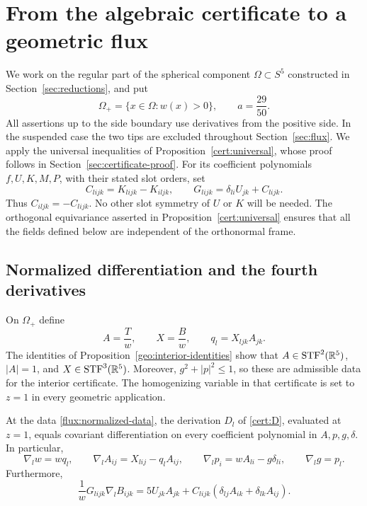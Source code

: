\section{From the algebraic certificate to a geometric flux}
\label{flux:section}
\label{sec:flux}

We work on the regular part of the spherical component $\Omega\subset S^5$
constructed in Section~\ref{sec:reductions}, and put
\[
  \Omega_+=\{x\in\Omega:w(x)>0\},\qquad a=\frac{29}{50}.
\]
All assertions up to the side boundary use derivatives from the positive
side.  In the suspended case the two tips are excluded throughout
Section~\ref{sec:flux}.  We apply the universal inequalities of
Proposition~\ref{cert:universal}, whose proof follows in
Section~\ref{sec:certificate-proof}.  For its coefficient polynomials
$f,U,K,M,P$, with their stated slot orders, set
\begin{equation}\label{flux:CG}
 C_{lijk}=K_{lijk}-K_{iljk},\qquad
 G_{lijk}=\delta_{li}U_{jk}+C_{lijk}.
\end{equation}
Thus $C_{iljk}=-C_{lijk}$.  No other slot symmetry of $U$ or $K$ will be
needed.  The orthogonal equivariance asserted in
Proposition~\ref{cert:universal} ensures that all the fields defined below
are independent of the orthonormal frame.

\subsection{Normalized differentiation and the fourth derivatives}

On $\Omega_+$ define
\begin{equation}\label{flux:normalized-data}
 A=\frac{T}{w},\qquad X=\frac{B}{w},\qquad
 q_l=X_{ljk}A_{jk}.
\end{equation}
The identities of Proposition~\ref{geo:interior-identities} show that
$A\in\operatorname{STF}^2(\mathbb R^5)$, $|A|=1$, and $X\in\operatorname{STF}^3(\mathbb R^5)$.
Moreover, $g^2+|p|^2\leq1$, so these are admissible data for the
interior certificate.  The homogenizing variable in that certificate is
set to $z=1$ in every geometric application.

\begin{lemma}\label{flux:normalized-differentiation}
At the data \eqref{flux:normalized-data}, the derivation $D_l$ of
\eqref{cert:D}, evaluated at $z=1$, equals covariant differentiation on
every coefficient polynomial in $A,p,g,\delta$.  In particular,
\begin{equation}\label{flux:first-derivatives}
 \nabla_lw=wq_l,\qquad
 \nabla_lA_{ij}=X_{lij}-q_lA_{ij},\qquad
 \nabla_lp_i=wA_{li}-g\delta_{li},\qquad
 \nabla_lg=p_l.
\end{equation}
Furthermore,
\begin{equation}\label{flux:fourth-elimination}
 \frac1wG_{lijk}\nabla_lB_{ijk}
 =5U_{jk}A_{jk}
   +C_{lijk}(\delta_{lj}A_{ik}+\delta_{lk}A_{ij}).
\end{equation}
\end{lemma}

